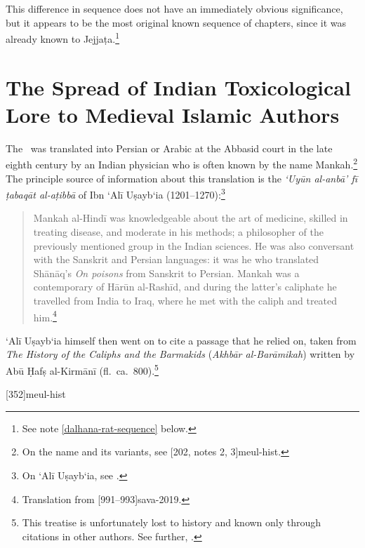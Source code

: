 
\noindent
This difference in sequence does not have an immediately obvious 
significance, but it appears to be the most original known sequence of 
chapters, since it was already known to Jejjaṭa.\footnote{See note 
\ref{dalhana-rat-sequence} below.}

\section{The Spread of Indian Toxicological Lore to Medieval Islamic  
Authors}

The \SS\ was translated into Persian or Arabic at the Abbasid court in
the late eighth century by an Indian physician who is often known by
the name Mankah.\footnote{On the name and its variants, see
    [202, notes 2, 3]{meul-hist}.}  The principle source of
    information about this translation is the 
    \emph{`Uyūn al-anbā' fī ṭabaqāt al-aṭibbā} of Ibn `Alī Uṣayb`ia 
    (1201--1270):\footnote{On `Alī
        Uṣayb`ia, see \cite{hill-2019}.}
\begin{quote}
    Mankah al-Hindī  was knowledgeable about the art of medicine,
skilled in treating disease, and moderate in his methods; a
philosopher of the previously mentioned group in the Indian
sciences. He was also conversant with the Sanskrit and Persian
languages: it was he who translated Shānāq’s \emph{On poisons}
from Sanskrit to Persian. Mankah was a contemporary of Hārūn
al-Rashīd, and during the latter’s caliphate he travelled from
India to Iraq, where he met with the caliph and treated 
him.\footnote{Translation from [991--993]{sava-2019}.}
\end{quote}
`Alī Uṣayb`ia himself then went on to cite a passage that he relied on, taken from  
\emph{The History of the Caliphs and the Barmakids}  (\emph{Akhbār 
al-Barāmikah}) written by  Abū Ḥafṣ 
al-Kirmānī (fl.\ ca.\ 800).\footnote{This treatise is unfortunately lost to history and 
known only 
through citations in other authors.   See further, \cite{bosw-1994,blad-2011}.}


[352]{meul-hist}
\cite{lang-2018}

